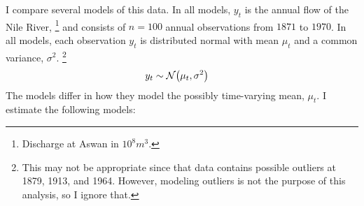 I compare several models of this data.
In all models, $y_{t}$ is the annual flow of the Nile River,%
\footnote{Discharge at Aswan in $10^8 m^{3}$.} %
and consists of $n = 100$ annual observations from $1871$ to $1970$.
In all models, each observation $y_{t}$ is distributed normal with mean $\mu_{t}$ and a common variance, $\sigma^{2}$.%
\footnote{
  This may not be appropriate since that data contains possible outliers at 1879, 1913, and 1964.
  However, modeling outliers is not the purpose of this analysis, so I ignore that.
}
\begin{equation}
  \label{dlm:eq:10}
  \begin{aligned}[t]
    y_{t} &\sim \mathcal{N}\mathopen{}\left(\mu_{t}, \sigma^{2}\right)\mathclose{}
  \end{aligned}
\end{equation}
The models differ in how they model the possibly time-varying mean, $\mu_{t}$.
I estimate the following models:

